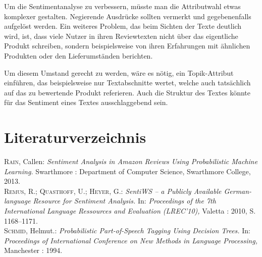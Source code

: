 \documentclass[a4paper]{article}
\begin{document}
Um die Sentimentanalyse zu verbessern, müsste man die Attributwahl etwas komplexer gestalten. Negierende Ausdrücke sollten vermerkt und gegebenenfalls aufgelöst werden.
Ein weiteres Problem, das beim Sichten der Texte deutlich wird, ist, dass viele Nutzer in ihren Reviewtexten nicht über das eigentliche Produkt schreiben, sondern beispielsweise von ihren Erfahrungen mit ähnlichen Produkten oder den Lieferumständen berichten.

Um diesem Umstand gerecht zu werden, wäre es nötig, ein Topik-Attribut einführen, das beispielsweise nur Textabschnitte wertet, welche auch tatsächlich auf das zu bewertende Produkt referieren. Auch die Struktur des Textes könnte für das Sentiment eines Textes ausschlaggebend sein.

\newpage


\section{Literaturverzeichnis}

\textsc{Rain,} Callen: \textit{Sentiment Analysis in Amazon Reviews Using Probabilistic Machine Learning.} Swarthmore : Department of Computer Science, Swarthmore College, 2013.\\[0.1cm]
\textsc{Remus,} R.; \textsc{Quasthoff,} U.; \textsc{Heyer,} G.: \textit{SentiWS -- a Publicly Available German-language Resource for Sentiment Analysis.} In: \textit{Proceedings of the 7th International Language Ressources and Evaluation (LREC'10),} Valetta : 2010, S. 1168--1171.\\[0.1cm]
\textsc{Schmid,} Helmut.: \textit{Probabilistic Part-of-Speech Tagging Using Decision Trees.} In: \textit{Proceedings of International Conference on New Methods in Language Processing,} Manchester : 1994.
\end{document}
